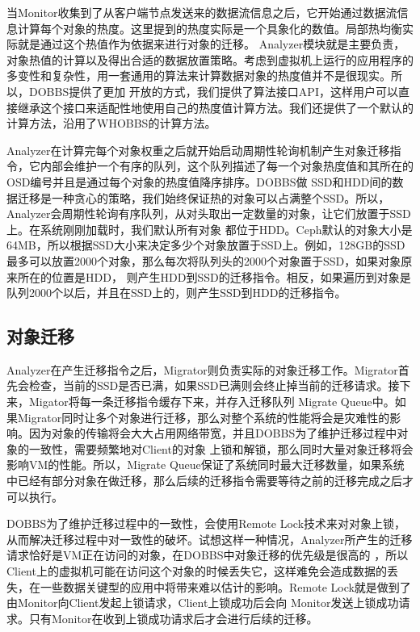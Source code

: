 当Monitor收集到了从客户端节点发送来的数据流信息之后，它开始通过数据流信息计算每个对象的热度。这里提到的热度实际是一个具象化的数值。局部热均衡实际就是通过这个热值作为依据来进行对象的迁移。
Analyzer模块就是主要负责，对象热值的计算以及得出合适的数据放置策略。考虑到虚拟机上运行的应用程序的多变性和复杂性，用一套通用的算法来计算数据对象的热度值并不是很现实。所以，DOBBS提供了更加
开放的方式，我们提供了算法接口API，这样用户可以直接继承这个接口来适配性地使用自己的热度值计算方法。我们还提供了一个默认的计算方法，沿用了WHOBBS\cite{lingxuan2015whobbs}的计算方法。

Analyzer在计算完每个对象权重之后就开始启动周期性轮询机制产生对象迁移指令，它内部会维护一个有序的队列，这个队列描述了每一个对象热度值和其所在的OSD编号并且是通过每个对象的热度值降序排序。DOBBS做
SSD和HDD间的数据迁移是一种贪心的策略，我们始终保证热的对象可以占满整个SSD。所以，Analyzer会周期性轮询有序队列，从对头取出一定数量的对象，让它们放置于SSD上。在系统刚刚加载时，我们默认所有对象
都位于HDD。Ceph默认的对象大小是64MB，所以根据SSD大小来决定多少个对象放置于SSD上。例如，128GB的SSD最多可以放置2000个对象，那么每次将队列头的2000个对象置于SSD，如果对象原来所在的位置是HDD，
则产生HDD到SSD的迁移指令。相反，如果遍历到对象是队列2000个以后，并且在SSD上的，则产生SSD到HDD的迁移指令。

\subsection{对象迁移}
Analyzer在产生迁移指令之后，Migrator则负责实际的对象迁移工作。Migrator首先会检查，当前的SSD是否已满，如果SSD已满则会终止掉当前的迁移请求。接下来，Migator将每一条迁移指令缓存下来，并存入迁移队列
Migrate Queue中。如果Migrator同时让多个对象进行迁移，那么对整个系统的性能将会是灾难性的影响。因为对象的传输将会大大占用网络带宽，并且DOBBS为了维护迁移过程中对象的一致性，需要频繁地对Client的对象
上锁和解锁，那么同时大量对象迁移将会影响VM的性能。所以，Migrate Queue保证了系统同时最大迁移数量，如果系统中已经有部分对象在做迁移，那么后续的迁移指令需要等待之前的迁移完成之后才可以执行。

DOBBS为了维护迁移过程中的一致性，会使用Remote Lock\cite{lingxuan2015whobbs}技术来对对象上锁，从而解决迁移过程中对一致性的破坏。试想这样一种情况，Analyzer所产生的迁移请求恰好是VM正在访问的对象，在DOBBS中对象迁移的优先级是很高的
，所以Client上的虚拟机可能在访问这个对象的时候丢失它，这样难免会造成数据的丢失，在一些数据关键型的应用中将带来难以估计的影响。Remote Lock就是做到了由Monitor向Client发起上锁请求，Client上锁成功后会向
Monitor发送上锁成功请求。只有Monitor在收到上锁成功请求后才会进行后续的迁移。

